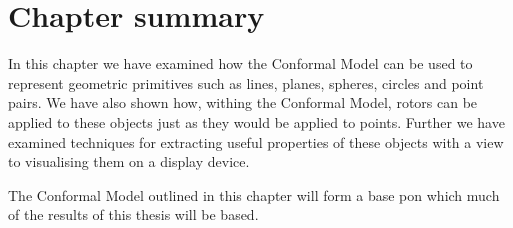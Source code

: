 \section{Chapter summary}

In this chapter we have examined how the Conformal Model can be used to
represent geometric primitives such as lines, planes, spheres, circles and point
pairs. We have also shown how, withing the Conformal Model, rotors can
be applied to these objects just as they would be applied to points. Further
we have examined techniques for extracting useful properties of these objects
with a view to visualising them on a display device.

The Conformal Model outlined in this chapter will form a base pon which much
of the results of this thesis will be based.
